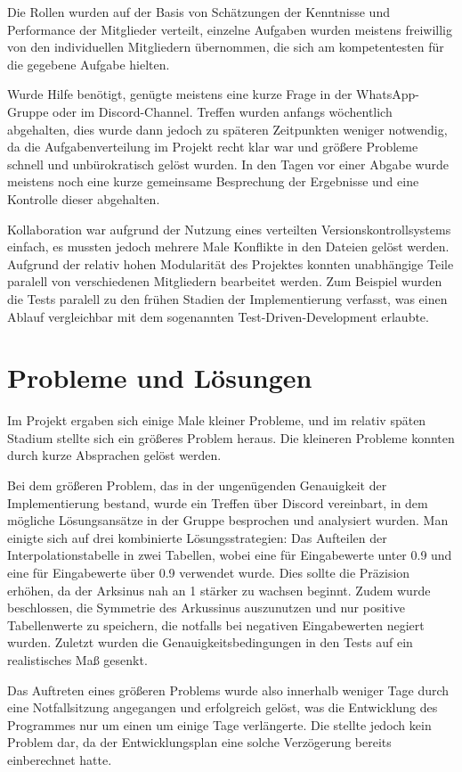 \documentclass{article}
\begin{document}
Die Rollen wurden auf der Basis von Schätzungen der Kenntnisse und
Performance der Mitglieder verteilt, einzelne Aufgaben wurden meistens
freiwillig von den individuellen Mitgliedern übernommen, die sich am
kompetentesten für die gegebene Aufgabe hielten.

Wurde Hilfe benötigt, genügte meistens eine kurze Frage in der
WhatsApp-Gruppe oder im Discord-Channel. Treffen wurden anfangs
wöchentlich abgehalten, dies wurde dann jedoch zu späteren Zeitpunkten
weniger notwendig, da die Aufgabenverteilung im Projekt recht klar war
und größere Probleme schnell und unbürokratisch gelöst wurden. In
den Tagen vor einer Abgabe wurde meistens noch eine kurze gemeinsame
Besprechung der Ergebnisse und eine Kontrolle dieser abgehalten.

Kollaboration war aufgrund der Nutzung eines verteilten
Versionskontrollsystems einfach, es mussten jedoch mehrere Male Konflikte
in den Dateien gelöst werden.  Aufgrund der relativ hohen Modularität
des Projektes konnten unabhängige Teile paralell von verschiedenen
Mitgliedern bearbeitet werden. Zum Beispiel wurden die Tests paralell
zu den frühen Stadien der Implementierung verfasst, was einen Ablauf
vergleichbar mit dem sogenannten Test-Driven-Development erlaubte.

\section{Probleme und Lösungen}

Im Projekt ergaben sich einige Male kleiner Probleme, und im relativ
späten Stadium stellte sich ein größeres Problem heraus. Die kleineren
Probleme konnten durch kurze Absprachen gelöst werden.

Bei dem größeren Problem, das in der ungenügenden Genauigkeit der
Implementierung bestand, wurde ein Treffen über Discord vereinbart,
in dem mögliche Lösungsansätze in der Gruppe besprochen und analysiert
wurden. Man einigte sich auf drei kombinierte Lösungsstrategien:
Das Aufteilen der Interpolationstabelle in zwei Tabellen, wobei
eine für Eingabewerte unter 0.9 und eine für Eingabewerte über 0.9
verwendet wurde. Dies sollte die Präzision erhöhen, da der Arksinus
nah an 1 stärker zu wachsen beginnt. Zudem wurde beschlossen, die
Symmetrie des Arkussinus auszunutzen und nur positive Tabellenwerte
zu speichern, die notfalls bei negativen Eingabewerten negiert wurden.
Zuletzt wurden die Genauigkeitsbedingungen in den Tests auf ein
realistisches Maß gesenkt.

Das Auftreten eines größeren Problems wurde also innerhalb weniger Tage
durch eine Notfallsitzung angegangen und erfolgreich gelöst, was die
Entwicklung des Programmes nur um einen um einige Tage verlängerte.
Die stellte jedoch kein Problem dar, da der Entwicklungsplan eine
solche Verzögerung bereits einberechnet hatte.
\end{document}

